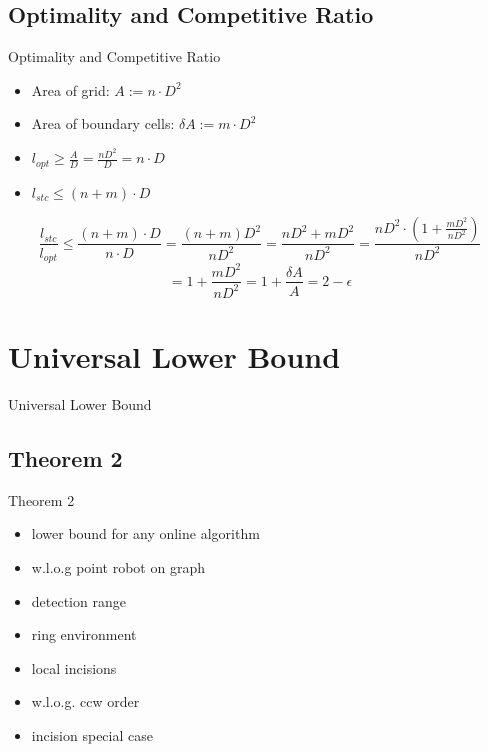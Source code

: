 \documentclass{beamer}
\begin{document}
\subsection{Optimality and Competitive Ratio}
\begin{frame}{Optimality and Competitive Ratio}
    \begin{itemize}
        \item Area of grid: $A := n \cdot D^2$
        \item Area of boundary cells: $\delta A := m \cdot D^2$
        \item $l_{opt} \geq \frac{A}{D} = \frac{nD^2}{D} = n \cdot D$
        \item $l_{stc} \leq (n + m) \cdot D$
    \end{itemize}


    $$ \frac{l_{stc}}{l_{opt}} \leq \frac{(n+m) \cdot D}{n \cdot D} = \frac{(n + m) D^2}{n D^2} = \frac{nD^2 + mD^2}{nD^2} = \frac{nD^2 \cdot (1 + \frac{mD^2}{nD^2})}{nD^2}$$
    $$= 1 + \frac{mD^2}{nD^2} = 1 + \frac{\delta A}{A} = 2 - \epsilon$$

\end{frame}

\section{Universal Lower Bound}
\begin{frame}{Universal Lower Bound}
\end{frame}

\subsection{Theorem 2}
\begin{frame}{Theorem 2}
    \begin{itemize}
        \item lower bound for any online algorithm
        \item w.l.o.g point robot on graph
        \item detection range
        \item ring environment
        \item local incisions
        \item w.l.o.g. ccw order
        \item incision special case
    \end{itemize}
\end{frame}
\end{document}
